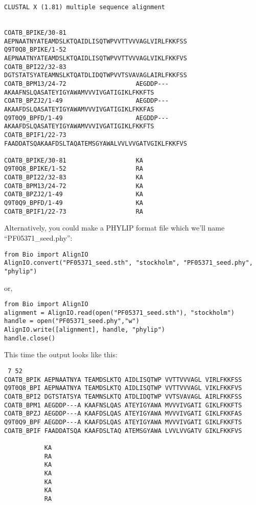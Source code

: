 \documentclass{report}
\begin{document}
\begin{verbatim}
CLUSTAL X (1.81) multiple sequence alignment


COATB_BPIKE/30-81                   AEPNAATNYATEAMDSLKTQAIDLISQTWPVVTTVVVAGLVIRLFKKFSS
Q9T0Q8_BPIKE/1-52                   AEPNAATNYATEAMDSLKTQAIDLISQTWPVVTTVVVAGLVIKLFKKFVS
COATB_BPI22/32-83                   DGTSTATSYATEAMNSLKTQATDLIDQTWPVVTSVAVAGLAIRLFKKFSS
COATB_BPM13/24-72                   AEGDDP---AKAAFNSLQASATEYIGYAWAMVVVIVGATIGIKLFKKFTS
COATB_BPZJ2/1-49                    AEGDDP---AKAAFDSLQASATEYIGYAWAMVVVIVGATIGIKLFKKFAS
Q9T0Q9_BPFD/1-49                    AEGDDP---AKAAFDSLQASATEYIGYAWAMVVVIVGATIGIKLFKKFTS
COATB_BPIF1/22-73                   FAADDATSQAKAAFDSLTAQATEMSGYAWALVVLVVGATVGIKLFKKFVS

COATB_BPIKE/30-81                   KA
Q9T0Q8_BPIKE/1-52                   RA
COATB_BPI22/32-83                   KA
COATB_BPM13/24-72                   KA
COATB_BPZJ2/1-49                    KA
Q9T0Q9_BPFD/1-49                    KA
COATB_BPIF1/22-73                   RA
\end{verbatim}

Alternatively, you could make a PHYLIP format file which we'll name ``PF05371\_seed.phy'':

\begin{verbatim}
from Bio import AlignIO
AlignIO.convert("PF05371_seed.sth", "stockholm", "PF05371_seed.phy", "phylip")
\end{verbatim}

\noindent or,

\begin{verbatim}
from Bio import AlignIO
alignment = AlignIO.read(open("PF05371_seed.sth"), "stockholm")
handle = open("PF05371_seed.phy","w")
AlignIO.write([alignment], handle, "phylip")
handle.close()
\end{verbatim}

This time the output looks like this:

\begin{verbatim}
 7 52
COATB_BPIK AEPNAATNYA TEAMDSLKTQ AIDLISQTWP VVTTVVVAGL VIRLFKKFSS
Q9T0Q8_BPI AEPNAATNYA TEAMDSLKTQ AIDLISQTWP VVTTVVVAGL VIKLFKKFVS
COATB_BPI2 DGTSTATSYA TEAMNSLKTQ ATDLIDQTWP VVTSVAVAGL AIRLFKKFSS
COATB_BPM1 AEGDDP---A KAAFNSLQAS ATEYIGYAWA MVVVIVGATI GIKLFKKFTS
COATB_BPZJ AEGDDP---A KAAFDSLQAS ATEYIGYAWA MVVVIVGATI GIKLFKKFAS
Q9T0Q9_BPF AEGDDP---A KAAFDSLQAS ATEYIGYAWA MVVVIVGATI GIKLFKKFTS
COATB_BPIF FAADDATSQA KAAFDSLTAQ ATEMSGYAWA LVVLVVGATV GIKLFKKFVS

           KA
           RA
           KA
           KA
           KA
           KA
           RA
\end{verbatim}
\end{document}
